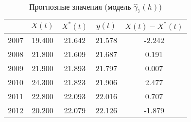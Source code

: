 \begin{table}[ht]
\centering
\caption{Прогнозные значения (модель $ \widehat{\gamma}_7(h) $)} 
\label{table:auto-class-20-prediction}
\begin{tabular}{r|cccc}
  \hline
 & $X(t)$ & $X^{*}(t)$ & $y(t)$ & $ X(t) - X^{*}(t) $ \\ 
  \hline
2007 & 19.400 & 21.642 & 21.578 & -2.242 \\ 
  2008 & 21.800 & 21.609 & 21.687 & 0.191 \\ 
  2009 & 21.900 & 21.893 & 21.797 & 0.007 \\ 
  2010 & 24.300 & 21.823 & 21.906 & 2.477 \\ 
  2011 & 22.800 & 22.093 & 22.016 & 0.707 \\ 
  2012 & 20.200 & 22.079 & 22.126 & -1.879 \\ 
   \hline
\end{tabular}
\end{table}
